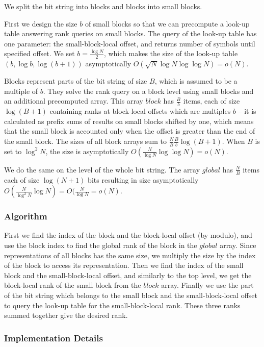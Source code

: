 We split the bit string into blocks and blocks into small blocks.

First we design the size $b$ of small blocks so that we can precompute a look-up table answering rank queries on small blocks.
The query of the look-up table has one parameter: the small-block-local offset, and returns number of symbols until specified offset.
We set $b = \frac{\log N}{2}$, which makes the size of the look-up table $(b, \log b, \log (b + 1))$ asymptotically $O(\sqrt{N} \log N \log \log N) = o(N)$.

Blocks represent parts of the bit string of size $B$, which is assumed to be a multiple of $b$.
They solve the rank query on a block level using small blocks and an additional precomputed array.
This array $block$ has $\frac{B}{b}$ items, each of size $\log (B + 1)$ containing ranks at block-local offsets which are multiples $b$ -- it is calculated as prefix sums of results on small blocks shifted by one, which means that the small block is accounted only when the offset is greater than the end of the small block.
The sizes of all block arrays sum to $\frac{N}{B} \frac{B}{b} \log (B + 1)$.
When $B$ is set to $\log^2 N$, the size is asymptotically $O(\frac{N}{\log N} \log \log N) = o(N)$.

We do the same on the level of the whole bit string.
The array $global$ has $\frac{N}{B}$ items each of size $\log (N+1)$ bits resulting in size asymptotically $O(\frac{N}{\log^2 N} \log{N}) = O(\frac{N}{\log N} = o(N)$.

\subsubsection{Algorithm}

First we find the index of the block and the block-local offset (by modulo), and use the block index to find the global rank of the block in the $global$ array.
Since representations of all blocks has the same size, we multiply the size by the index of the block to access its representation.
Then we find the index of the small block and the small-block-local offset, and similarly to the top level, we get the block-local rank of the small block from the $block$ array.
Finally we use the part of the bit string which belongs to the small block and the small-block-local offset to query the look-up table for the small-block-local rank.
These three ranks summed together give the desired rank.

\subsubsection{Implementation Details}

